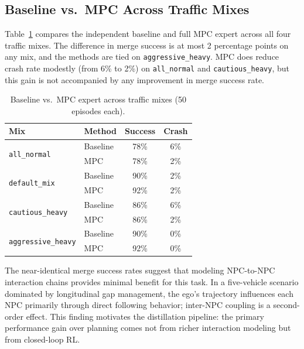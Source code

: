 \documentclass[conference]{IEEEtran}
\begin{document}
\subsection{Baseline vs.\ MPC Across Traffic Mixes}

Table~\ref{tab:baseline_mpc} compares the independent baseline and full
MPC expert across all four traffic mixes.
The difference in merge success is at most 2 percentage points on any mix,
and the methods are tied on \texttt{aggressive\_heavy}.
MPC does reduce crash rate modestly (from 6\% to 2\%) on
\texttt{all\_normal} and \texttt{cautious\_heavy}, but this gain is not
accompanied by any improvement in merge success rate.

\begin{table}[t]
  \caption{Baseline vs.\ MPC expert across traffic mixes (50 episodes each).}
  \label{tab:baseline_mpc}
  \centering
  \begin{tabular}{llcc}
    \toprule
    Mix & Method & Success & Crash \\
    \midrule
    \multirow{2}{*}{\texttt{all\_normal}}
      & Baseline & 78\% & 6\% \\
      & MPC      & 78\% & 2\% \\
    \midrule
    \multirow{2}{*}{\texttt{default\_mix}}
      & Baseline & 90\% & 2\% \\
      & MPC      & 92\% & 2\% \\
    \midrule
    \multirow{2}{*}{\texttt{cautious\_heavy}}
      & Baseline & 86\% & 6\% \\
      & MPC      & 86\% & 2\% \\
    \midrule
    \multirow{2}{*}{\texttt{aggressive\_heavy}}
      & Baseline & 90\% & 0\% \\
      & MPC      & 92\% & 0\% \\
    \bottomrule
  \end{tabular}
\end{table}

The near-identical merge success rates suggest that modeling NPC-to-NPC
interaction chains provides minimal benefit for this task.
In a five-vehicle scenario dominated by longitudinal gap management, the
ego's trajectory influences each NPC primarily through direct following
behavior; inter-NPC coupling is a second-order effect.
This finding motivates the distillation pipeline: the primary performance
gain over planning comes not from richer interaction modeling but from
closed-loop RL.
\end{document}
